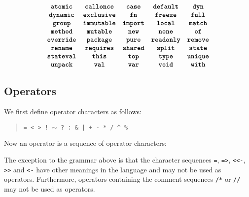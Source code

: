 \begin{quote}
 \oneof 
\end{quote}
\[
  \begin{array}{cccccc}
  \texttt{\textbf{atomic}}
  & \texttt{\textbf{callonce}}
  & \texttt{\textbf{case}} 
  & \texttt{\textbf{default}}
  & \texttt{\textbf{dyn}} 
  \\ 
  \texttt{\textbf{dynamic}}
  & \texttt{\textbf{exclusive}} 
  & \texttt{\textbf{fn}}
  & \texttt{\textbf{freeze}}
  & \texttt{\textbf{full}} 
  \\
  \texttt{\textbf{group}}  
  &\texttt{\textbf{immutable}}
  & \texttt{\textbf{import}}
  & \texttt{\textbf{local}}
  & \texttt{\textbf{match}}
  \\
  \texttt{\textbf{method}}
  & \texttt{\textbf{mutable}}
  &\texttt{\textbf{new}}
  & \texttt{\textbf{none}}
  & \texttt{\textbf{of}}
  \\
  \texttt{\textbf{override}} 
  & \texttt{\textbf{package}}
  & \texttt{\textbf{pure}}
  & \texttt{\textbf{readonly}}
  & \texttt{\textbf{remove}}
  \\
  \texttt{\textbf{rename}}
  & \texttt{\textbf{requires}}
  &\texttt{\textbf{shared}}
  & \texttt{\textbf{split}}  
  & \texttt{\textbf{state}}
  \\
  \texttt{\textbf{stateval}}
  & \texttt{\textbf{this}}
  & \texttt{\textbf{top}}
  & \texttt{\textbf{type}} 
  & \texttt{\textbf{unique}} 
  \\ 
  \texttt{\textbf{unpack}}
  & \texttt{\textbf{val}}
  & \texttt{\textbf{var}}
  & \texttt{\textbf{void}}
  & \texttt{\textbf{with}}
  \end{array}
\]







\subsection{Operators}

We first define operator characters as follows:

\begin{quote}

 \oneof

 \texttt{= < > ! $\sim$ ? : \& | + - * / \^{} \%}

\end{quote}

Now an operator is a sequence of operator characters:

\begin{quote}


 {}

 {} 

\end{quote}

The exception to the grammar above is that the character sequences
\texttt{=}, \texttt{=>}, \texttt{<{}<-}, \texttt{>{}>} and \texttt{<-} have
other meanings in the language and may not be used as operators.
Furthermore, operators containing the comment sequences \texttt{/*}
or \texttt{//} may not be used as operators.
